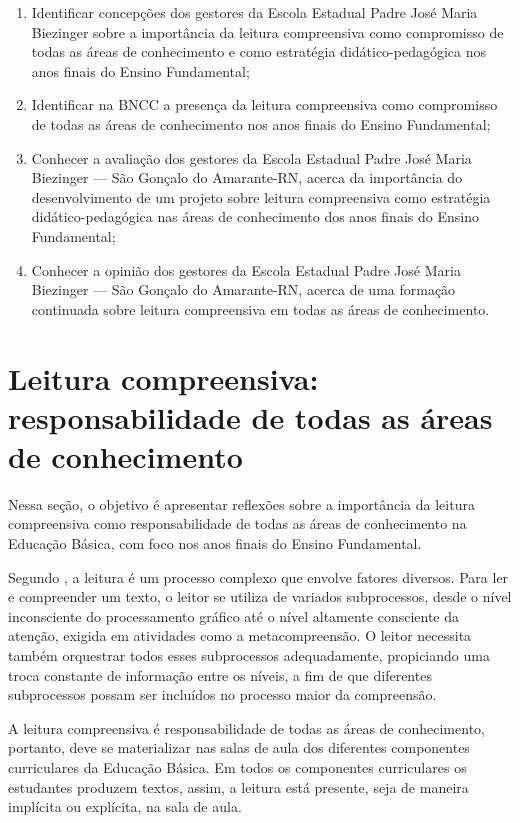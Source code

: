 \begin{refsection}
    \begin{enumerate}
        \item Identificar concepções dos gestores da Escola Estadual Padre José Maria Biezinger sobre a importância da leitura compreensiva como compromisso de todas as áreas de conhecimento e como estratégia didático-pedagógica nos anos finais do Ensino Fundamental;  
        \item Identificar na BNCC \cite{BaNacCurEF2017} a presença da leitura compreensiva como compromisso de todas as áreas de conhecimento nos anos finais do Ensino Fundamental; 
        \item Conhecer a avaliação dos gestores da Escola Estadual Padre José Maria Biezinger --- São Gonçalo do Amarante-RN, acerca da importância do desenvolvimento de um projeto sobre leitura compreensiva como estratégia didático-pedagógica nas áreas de conhecimento dos anos finais do Ensino Fundamental;
        \item Conhecer a opinião dos gestores da Escola Estadual Padre José Maria Biezinger --- São Gonçalo do Amarante-RN, acerca de uma formação continuada sobre leitura compreensiva em todas as áreas de conhecimento.
    \end{enumerate}

    \section{Leitura compreensiva: responsabilidade de todas as áreas de conhecimento}

    Nessa seção, o objetivo é apresentar reflexões sobre a importância da leitura compreensiva como responsabilidade de todas as áreas de conhecimento na Educação Básica, com foco nos anos finais do Ensino Fundamental. 

    Segundo \textcite{Leffa1996Fatores}, a leitura é um processo complexo que envolve fatores diversos. Para ler e compreender um texto, o leitor se utiliza de variados subprocessos, desde o nível inconsciente do processamento gráfico até o nível altamente consciente da atenção, exigida em atividades como a metacompreensão.  O leitor necessita também orquestrar todos esses subprocessos adequadamente, propiciando uma troca constante de informação entre os níveis, a fim de que diferentes subprocessos possam ser incluídos no processo maior da compreensão. 

    A leitura compreensiva é responsabilidade de todas as áreas de conhecimento, portanto, deve se materializar nas salas de aula dos diferentes componentes curriculares da Educação Básica. Em todos os componentes curriculares os estudantes produzem textos, assim, a leitura está presente, seja de maneira implícita ou explícita, na sala de aula. 


\end{refsection}
